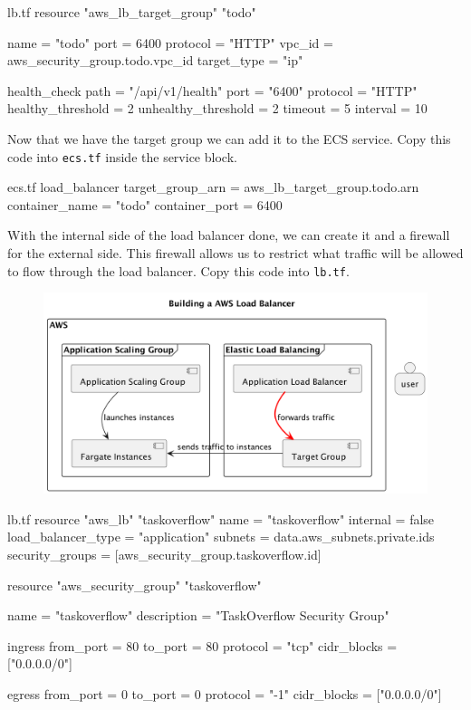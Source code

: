 \documentclass{csse4400}
\begin{document}
\begin{code}[language=terraform,numbers=none,keepspaces=true]{lb.tf}
resource "aws_lb_target_group" "todo" {
  name          = "todo"
  port          = 6400
  protocol      = "HTTP"
  vpc_id        = aws_security_group.todo.vpc_id
  target_type   = "ip"

  health_check {
    path                = "/api/v1/health"
    port                = "6400"
    protocol            = "HTTP"
    healthy_threshold   = 2
    unhealthy_threshold = 2
    timeout             = 5
    interval            = 10
  }
}
\end{code}

Now that we have the target group we can add it to the ECS service. Copy this code into \texttt{ecs.tf} inside the service block.

\begin{code}[language=terraform,numbers=none,keepspaces=true]{ecs.tf}
  load_balancer {
    target_group_arn = aws_lb_target_group.todo.arn
    container_name   = "todo"
    container_port   = 6400
  }
\end{code}

With the internal side of the load balancer done, we can create it and a firewall for the external side.
This firewall allows us to restrict what traffic will be allowed to flow through the load balancer.
Copy this code into \texttt{lb.tf}.

\begin{figure}[H]
  \begin{center}
    \includegraphics[scale=0.2]{diagrams/lb3fargate}
  \end{center}
\end{figure}

\begin{code}[language=terraform,numbers=none,keepspaces=true]{lb.tf}
resource "aws_lb" "taskoverflow" {
  name               = "taskoverflow"
  internal           = false
  load_balancer_type = "application"
  subnets            = data.aws_subnets.private.ids
  security_groups    = [aws_security_group.taskoverflow.id]
}

resource "aws_security_group" "taskoverflow" {
  name        = "taskoverflow"
  description = "TaskOverflow Security Group"

  ingress {
    from_port     = 80
    to_port       = 80
    protocol      = "tcp"
    cidr_blocks   = ["0.0.0.0/0"]
  }

  egress {
    from_port     = 0
    to_port       = 0
    protocol      = "-1"
    cidr_blocks   = ["0.0.0.0/0"]
  }
}
\end{code}
\end{document}
